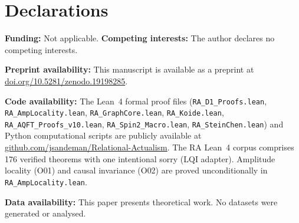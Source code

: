 \documentclass[11pt,a4paper]{article}
\theoremstyle{plain}
\theoremstyle{definition}
\theoremstyle{remark}
\begin{document}
\section*{Declarations}
\textbf{Funding:} Not applicable.\quad
\textbf{Competing interests:} The author declares no competing interests.

\textbf{Preprint availability:} This manuscript is available as a preprint at
\href{https://doi.org/10.5281/zenodo.19198285}{doi.org/10.5281/zenodo.19198285}.

\textbf{Code availability:} The Lean~4 formal proof files (\texttt{RA\_D1\_Proofs.lean}, \texttt{RA\_AmpLocality.lean}, \texttt{RA\_GraphCore.lean}, \texttt{RA\_Koide.lean}, \texttt{RA\_AQFT\_Proofs\_v10.lean}, \texttt{RA\_Spin2\_Macro.lean}, \texttt{RA\_SteinChen.lean}) and Python computational scripts are publicly available at \href{https://github.com/jsandeman/Relational-Actualism}{github.com/jsandeman/Relational-Actualism}. The RA Lean~4 corpus comprises 176 verified theorems with one intentional sorry (LQI adapter). Amplitude locality (O01) and causal invariance (O02) are proved unconditionally in \texttt{RA\_AmpLocality.lean}.

\textbf{Data availability:} This paper presents theoretical work. No datasets
were generated or analysed.
\end{document}
